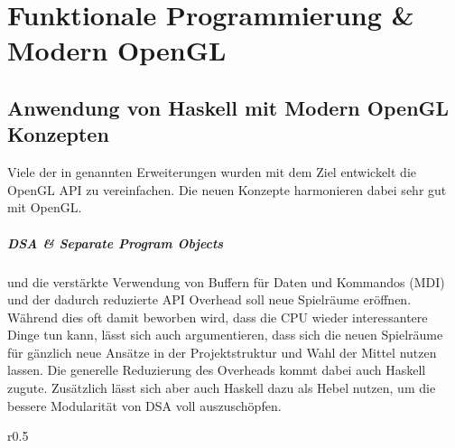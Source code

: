 \chapter{Funktionale Programmierung \& Modern OpenGL}
\label{chap:haskell-modern-gl}

\begingroup
\setlength\intextsep{0pt}
\section{Anwendung von Haskell mit Modern OpenGL Konzepten}\label{sec:haskell-gl-anwendung}

Viele der in  genannten Erweiterungen wurden mit dem Ziel entwickelt die OpenGL API zu vereinfachen. Die neuen Konzepte harmonieren dabei sehr gut mit OpenGL.

\paragraph{\acl{DSA} \& Separate Program Objects} und die verstärkte Verwendung von Buffern für Daten und Kommandos (\ac{MDI}) und der dadurch reduzierte API Overhead soll neue Spielräume eröffnen. Während dies oft damit beworben wird, dass die CPU wieder interessantere Dinge tun kann, lässt sich auch argumentieren, dass sich die neuen Spielräume für gänzlich neue Ansätze in der Projektstruktur und Wahl der Mittel nutzen lassen. Die generelle Reduzierung des Overheads kommt dabei auch Haskell zugute. Zusätzlich lässt sich aber auch Haskell dazu als Hebel nutzen, um die bessere Modularität von \ac{DSA} voll auszuschöpfen.

\begin{wrapfigure}{r}{0.5\linewidth}
\centering
{}
\end{wrapfigure}

